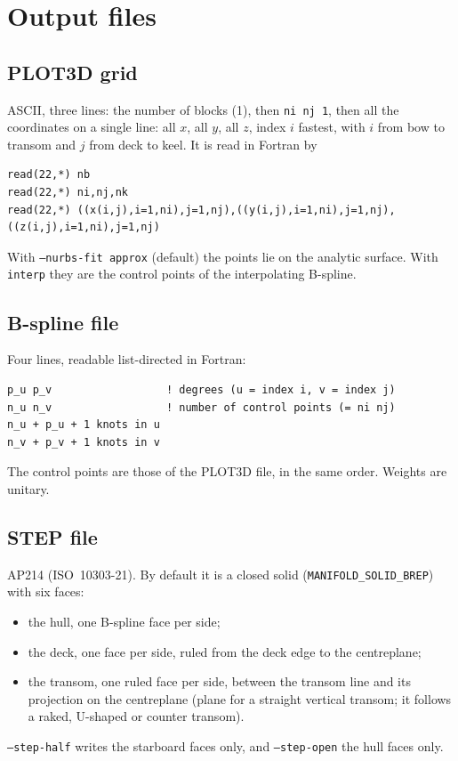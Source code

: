\documentclass[11pt,a4paper]{article}
\newcommand{\cmd}[1]{\texttt{#1}}
\begin{document}
\section{Output files}
\subsection{PLOT3D grid}
ASCII, three lines: the number of blocks (1), then \cmd{ni nj 1}, then all the coordinates on a
single line: all $x$, all $y$, all $z$, index $i$ fastest, with $i$ from bow to transom and $j$ from
deck to keel. It is read in Fortran by
\begin{lstlisting}
read(22,*) nb
read(22,*) ni,nj,nk
read(22,*) ((x(i,j),i=1,ni),j=1,nj),((y(i,j),i=1,ni),j=1,nj),((z(i,j),i=1,ni),j=1,nj)
\end{lstlisting} With \cmd{--nurbs-fit approx} (default) the
points lie on the analytic surface. With \cmd{interp} they are the control points of the
interpolating B-spline.

\subsection{B-spline file}
Four lines, readable list-directed in Fortran:
\begin{lstlisting}
p_u p_v                  ! degrees (u = index i, v = index j)
n_u n_v                  ! number of control points (= ni nj)
n_u + p_u + 1 knots in u
n_v + p_v + 1 knots in v
\end{lstlisting}
The control points are those of the PLOT3D file, in the same order. Weights are unitary.

\subsection{STEP file}
AP214 (ISO~10303-21). By default it is a closed solid (\cmd{MANIFOLD\_SOLID\_BREP}) with six
faces:
\begin{itemize}
\item the hull, one B-spline face per side;
\item the deck, one face per side, ruled from the deck edge to the centreplane;
\item the transom, one ruled face per side, between the transom line and its projection on the
  centreplane (plane for a straight vertical transom; it follows a raked, U-shaped or counter
  transom).
\end{itemize}
\cmd{--step-half} writes the starboard faces only, and \cmd{--step-open} the hull faces only.
\end{document}
